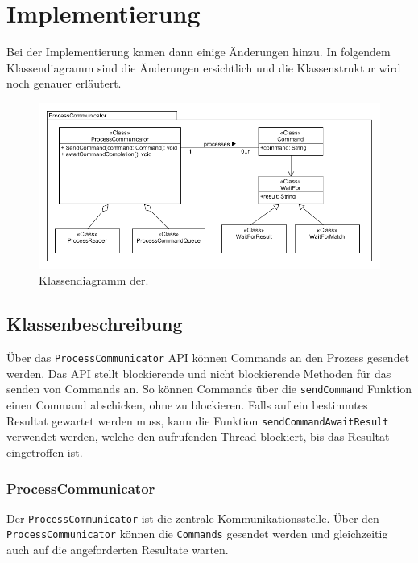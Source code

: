 \section{Implementierung}

Bei der Implementierung kamen dann einige Änderungen hinzu. In folgendem Klassendiagramm sind die Änderungen ersichtlich und die Klassenstruktur wird noch genauer erläutert.

\begin{figure}

	\centering
		\includegraphics[scale=0.75]{forthcommunication/communicator.png}
		\caption{Klassendiagramm der.}
		\label{fig:extensionpoint}

\end{figure}

\newpage

\subsection{Klassenbeschreibung}

Über das \verb!ProcessCommunicator! API können Commands an den Prozess gesendet werden. Das API stellt blockierende und nicht blockierende Methoden für das senden von Commands an. So können Commands über die \verb!sendCommand! Funktion einen Command abschicken, ohne zu blockieren. Falls auf ein bestimmtes Resultat gewartet werden muss, kann die Funktion \verb!sendCommandAwaitResult! verwendet werden, welche den aufrufenden Thread blockiert, bis das Resultat eingetroffen ist. 

\subsubsection{ProcessCommunicator}

Der \verb!ProcessCommunicator! ist die zentrale Kommunikationsstelle. Über den \verb!ProcessCommunicator! können die \verb!Commands! gesendet werden und gleichzeitig auch auf die angeforderten Resultate warten.

